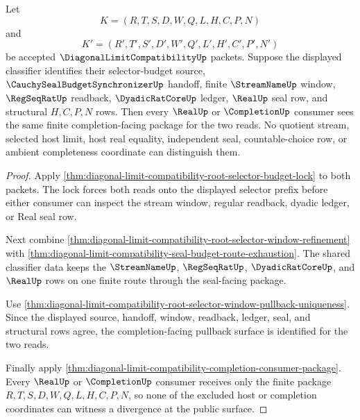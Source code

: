 \begin{theorem}
\label{thm:diagonal-limit-compatibility-root-selector-route-determinacy}
Let
$$
K=(R,T,S,D,W,Q,L,H,C,P,N)
$$
and
$$
K'=(R',T',S',D',W',Q',L',H',C',P',N')
$$
be accepted $\DiagonalLimitCompatibilityUp$ packets. Suppose the displayed classifier identifies their selector-budget source, $\CauchySealBudgetSynchronizerUp$ handoff, finite $\StreamNameUp$ window, $\RegSeqRatUp$ readback, $\DyadicRatCoreUp$ ledger, $\RealUp$ seal row, and structural $H,C,P,N$ rows. Then every $\RealUp$ or $\CompletionUp$ consumer sees the same finite completion-facing package for the two reads. No quotient stream, selected host limit, host real equality, independent seal, countable-choice row, or ambient completeness coordinate can distinguish them.
\end{theorem}
\begin{proof}
Apply \autoref{thm:diagonal-limit-compatibility-root-selector-budget-lock} to both packets. The lock forces both reads onto the displayed selector prefix before either consumer can inspect the stream window, regular readback, dyadic ledger, or Real seal row.

Next combine \autoref{thm:diagonal-limit-compatibility-root-selector-window-refinement} with \autoref{thm:diagonal-limit-compatibility-seal-budget-route-exhaustion}. The shared classifier data keeps the $\StreamNameUp$, $\RegSeqRatUp$, $\DyadicRatCoreUp$, and $\RealUp$ rows on one finite route through the seal-facing package.

Use \autoref{thm:diagonal-limit-compatibility-root-selector-window-pullback-uniqueness}. Since the displayed source, handoff, window, readback, ledger, seal, and structural rows agree, the completion-facing pullback surface is identified for the two reads.

Finally apply \autoref{thm:diagonal-limit-compatibility-completion-consumer-package}. Every $\RealUp$ or $\CompletionUp$ consumer receives only the finite package $R,T,S,D,W,Q,L,H,C,P,N$, so none of the excluded host or completion coordinates can witness a divergence at the public surface.
\end{proof}

